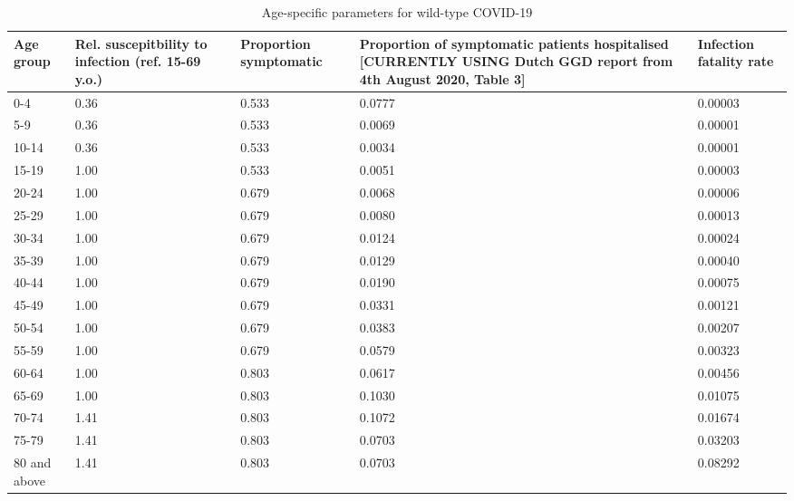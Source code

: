 \begin{table}
\centering
\caption{Age-specific parameters for wild-type COVID-19}
\label{agespec_table}
\begin{tabular}{p{2cm} p{3cm} p{3cm} p{3cm} p{3cm}}
\toprule
   Age group & Rel. suscepitbility to infection (ref. 15-69 y.o.)\cite{zhang-2020-a} & Proportion symptomatic\cite{sah-2021} & Proportion of symptomatic patients hospitalised [CURRENTLY USING Dutch GGD report from 4th August 2020, Table 3] & Infection fatality rate\cite{odriscoll-2021} \\
\midrule
0-4 & 0.36 & 0.533 & 0.0777 & 0.00003 \\
5-9 & 0.36 & 0.533 & 0.0069 & 0.00001 \\
10-14 & 0.36 & 0.533 & 0.0034 & 0.00001 \\
15-19 & 1.00 & 0.533 & 0.0051 & 0.00003 \\
20-24 & 1.00 & 0.679 & 0.0068 & 0.00006 \\
25-29 & 1.00 & 0.679 & 0.0080 & 0.00013 \\
30-34 & 1.00 & 0.679 & 0.0124 & 0.00024 \\
35-39 & 1.00 & 0.679 & 0.0129 & 0.00040 \\
40-44 & 1.00 & 0.679 & 0.0190 & 0.00075 \\
45-49 & 1.00 & 0.679 & 0.0331 & 0.00121 \\
50-54 & 1.00 & 0.679 & 0.0383 & 0.00207 \\
55-59 & 1.00 & 0.679 & 0.0579 & 0.00323 \\
60-64 & 1.00 & 0.803 & 0.0617 & 0.00456 \\
65-69 & 1.00 & 0.803 & 0.1030 & 0.01075 \\
70-74 & 1.41 & 0.803 & 0.1072 & 0.01674 \\
75-79 & 1.41 & 0.803 & 0.0703 & 0.03203 \\
80 and above & 1.41 & 0.803 & 0.0703 & 0.08292 \\
\bottomrule
\end{tabular}
\end{table}
